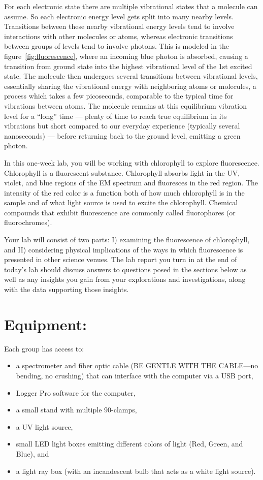 For each electronic state there are multiple vibrational states that a molecule can assume. 
So each electronic energy level gets split into many nearby levels. 
Transitions between these nearby vibrational energy levels tend to involve interactions with other molecules or atoms, whereas electronic transitions between groups of levels tend to involve photons. 
This is modeled in the figure~\ref{fig:fluorescence}, where an incoming blue photon is absorbed, causing a transition from ground state into the highest vibrational level of the 1st excited state. 
The molecule then undergoes several transitions between vibrational levels, essentially sharing the vibrational energy with neighboring atoms or molecules, a process which takes a few picoseconds, comparable to the typical time for vibrations between atoms.
The molecule remains at this equilibrium vibration level for a ``long'' time — plenty of time to reach true equilibrium in its vibrations but short compared to our everyday experience (typically several nanoseconds) — before returning back to the ground level, emitting a green photon.
\par 
In this one-week lab, you will be working with chlorophyll to explore fluorescence. 
Chlorophyll is a fluorescent substance. 
Chlorophyll absorbs light in the UV, violet, and blue regions of the EM spectrum and fluoresces in the red region. 
The intensity of the red color is a function both of how much chlorophyll is in the sample and of what light source is used to excite the chlorophyll. 
Chemical compounds that exhibit fluorescence are commonly called fluorophores (or fluorochromes).
\par 
Your lab will consist of two parts: I) examining the fluorescence of chlorophyll, and II) considering physical implications of the ways in which fluorescence is presented in other science venues. 
The lab report you turn in at the end of today's lab should discuss answers to questions posed in the sections below as well as any insights you gain from your explorations and investigations, along with the data supporting those insights.

\section*{Equipment:}
Each group has access to:
\begin{itemize}
\itemsep-0.3em
\item a spectrometer and fiber optic cable (BE GENTLE WITH THE CABLE—no bending, no crushing) that can interface with the computer via a USB port,
\item Logger Pro software for the computer,
\item a small stand with multiple 90-clamps,
\item a UV light source,
\item small LED light boxes emitting different colors of light (Red, Green, and Blue), and
\item a light ray box (with an incandescent bulb that acts as a white light source).
\end{itemize}

